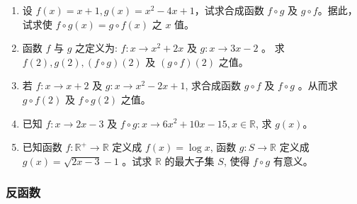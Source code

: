 \documentclass[UTF8]{ctexart}
\begin{document}
\begin{enumerate}
    \item 设 $f(x)=x+1, g(x)=x^2-4 x+1$，试求合成函数 $f \circ g$ 及 $g \circ f$。据此，试求使 $f \circ g(x)=g \circ f(x)$ 之 $x$ 值。
    \item 函数 $f$ 与 $g$ 之定义为:
    $f: x \rightarrow x^2+2 x$ 及 $g: x \rightarrow 3 x-2$ 。
    求 $f(2), g(2),(f \circ g)(2)$ 及 $(g \circ f)(2)$ 之值。
    \item 若 $f: x \rightarrow x+2$ 及 $g: x \rightarrow x^2-2 x+1$, 求合成函数 $g \circ f$ 及 $f \circ g$ 。从而求 $g \circ f(2)$ 及 $f \circ g(2)$ 之值。
    \item 已知 $f: x \rightarrow 2 x-3$ 及 $f \circ g: x \rightarrow 6 x^2+10 x-15, x \in \mathbb{R}$, 求 $g(x)$。
    \item 已知函数 $f: \mathbb{R}^{+} \rightarrow \mathbb{R}$ 定义成 $f(x)=\log x$, 函数 $g: S \rightarrow \mathbb{R}$ 定义成 $g(x)=\sqrt{2 x-3}-1$ 。试求 $\mathbb{R}$ 的最大子集 $S$, 使得 $f \circ g$ 有意义。
\end{enumerate}

\subsubsection*{反函数}
\end{document}

